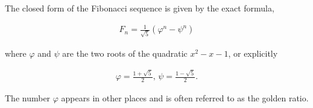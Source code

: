 \vspace{\baselineskip}
\begin{theorem}
	The closed form of the Fibonacci sequence is given by the exact formula,
	
	\begin{align*}
		F_n = \frac{1}{\sqrt{5}}\left( \varphi^n - \psi^n \right)
	\end{align*}
	
	where $\varphi$ and $\psi$ are the two roots of the quadratic $x^2 - x - 1$, or explicitly
	
	\begin{align*}
		\varphi = \frac{1 + \sqrt{5}}{2}, \, \psi = \frac{1 - \sqrt{5}}{2}.
	\end{align*}
	
	The number $\varphi$ appears in other places and is often referred to as the golden ratio.
\end{theorem}
